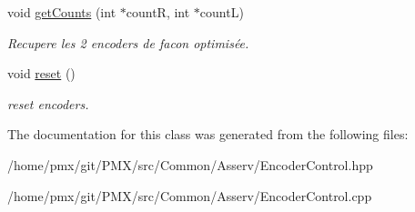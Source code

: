 \begin{DoxyCompactItemize}
void \hyperlink{classEncoderControl_a243a72ff82bde18e2ab180fff50796f5}{get\+Counts} (int $\ast$countR, int $\ast$countL)
\begin{DoxyCompactList}\small\item\em Recupere les 2 encoders de facon optimisée. \end{DoxyCompactList}\item 
\mbox{\label{classEncoderControl_a1fce19ff2c1caf9181ee29490d867f53}} 
void \hyperlink{classEncoderControl_a1fce19ff2c1caf9181ee29490d867f53}{reset} ()
\begin{DoxyCompactList}\small\item\em reset encoders. \end{DoxyCompactList}\end{DoxyCompactItemize}


The documentation for this class was generated from the following files\+:\begin{DoxyCompactItemize}
\item 
/home/pmx/git/\+P\+M\+X/src/\+Common/\+Asserv/Encoder\+Control.\+hpp\item 
/home/pmx/git/\+P\+M\+X/src/\+Common/\+Asserv/Encoder\+Control.\+cpp\end{DoxyCompactItemize}
